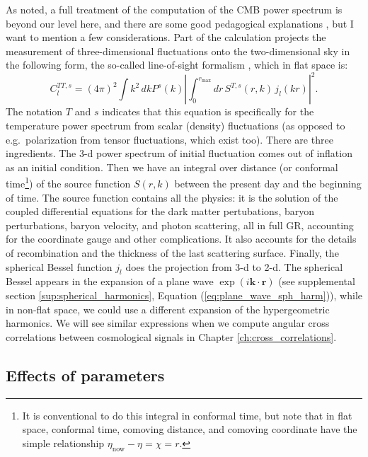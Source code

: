 As noted, a full treatment of the computation of the CMB power spectrum is beyond our level here, and there are some good pedagogical explanations \citep{2022cosm.book.....B,2006APh....25..151L}, but I want to mention a few considerations.  Part of the calculation projects the measurement of three-dimensional fluctuations onto the two-dimensional sky in the following form, the so-called line-of-sight formalism \citep{1996ApJ...469..437S}, which in flat space is:
\begin{equation}
  C^{TT,s}_l = (4\pi)^2 \int k^2\, dk P^s(k) \left| \int_0^{r_\textrm{max}} dr \, S^{T,s}(r,k)\, j_l(kr) \right|^2.
\end{equation}
The notation $T$ and $s$ indicates that this equation is specifically for the temperature power spectrum from scalar (density) fluctuations (as opposed to e.g.\ polarization from tensor fluctuations, which exist too).  There are three ingredients.  The 3-d power spectrum of initial fluctuation comes out of inflation as an initial condition.  Then we have an integral over distance (or conformal time\footnote{It is conventional to do this integral in conformal time, but note that in flat space, conformal time, comoving distance, and comoving coordinate have the simple relationship $\eta_\textrm{now} - \eta = \chi = r$.}) of the source function $S(r,k)$ between the present day and the beginning of time.  The source function contains all the physics: it is the solution of the coupled differential equations for the dark matter pertubations, baryon perturbations, baryon velocity, and photon scattering, all in full GR, accounting for the coordinate gauge and other complications.  It also accounts for the details of recombination and the thickness of the last scattering surface.  Finally, the spherical Bessel function $j_l$ does the projection from 3-d to 2-d.  The spherical Bessel appears in the expansion of a plane wave $\exp(i \mathbf{k} \cdot \mathbf{r})$ (see supplemental section \ref{sup:spherical_harmonics}, Equation (\ref{eq:plane_wave_sph_harm})), while in non-flat space, we could use a different expansion of the hypergeometric harmonics.  We will see similar expressions when we compute angular cross correlations between cosmological signals in Chapter \ref{ch:cross_correlations}.



\subsection{Effects of parameters}

